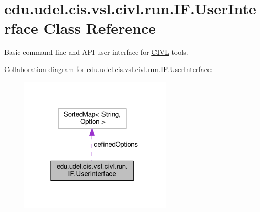 \hypertarget{classedu_1_1udel_1_1cis_1_1vsl_1_1civl_1_1run_1_1IF_1_1UserInterface}{}\section{edu.\+udel.\+cis.\+vsl.\+civl.\+run.\+I\+F.\+User\+Interface Class Reference}
\label{classedu_1_1udel_1_1cis_1_1vsl_1_1civl_1_1run_1_1IF_1_1UserInterface}


Basic command line and A\+P\+I user interface for \hyperlink{classedu_1_1udel_1_1cis_1_1vsl_1_1civl_1_1CIVL}{C\+I\+V\+L} tools.  




Collaboration diagram for edu.\+udel.\+cis.\+vsl.\+civl.\+run.\+I\+F.\+User\+Interface\+:
\nopagebreak
\begin{figure}[H]
\begin{center}
\leavevmode
\includegraphics[width=210pt]{classedu_1_1udel_1_1cis_1_1vsl_1_1civl_1_1run_1_1IF_1_1UserInterface__coll__graph}
\end{center}
\end{figure}
